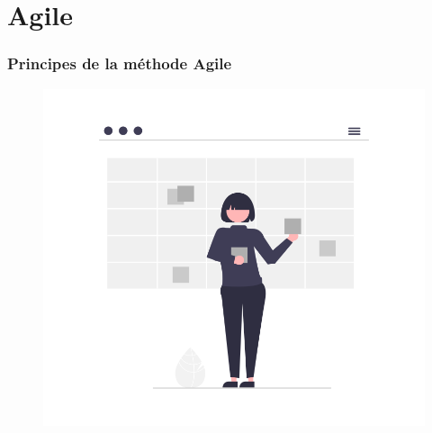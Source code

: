 \documentclass[9pt]{beamer}
\begin{document}
\section{Agile}
\begin{frame}
	\frametitle{Principes de la méthode Agile}
	\begin{figure}[!htb]
     \centering
     \includegraphics[width=.7\textwidth]{../media/Schedule}
   \label{Fig:schedule}
\end{figure}
\end{frame}
\end{document}
